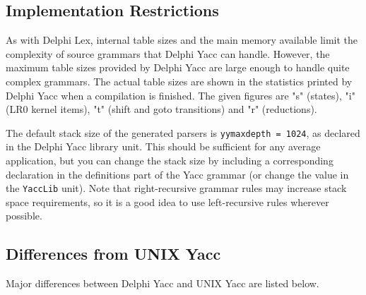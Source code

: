 \documentclass[a4paper]{article}
\begin{document}
\subsection{Implementation Restrictions}

As with Delphi Lex, internal table sizes and the main memory available limit the
complexity of source grammars that Delphi Yacc can handle. However, the maximum
table sizes provided by Delphi Yacc are large enough to handle quite complex
grammars. The actual table sizes are shown in the statistics printed by Delphi 
Yacc when a compilation
is finished. The given figures are "s" (states), "i" (LR0 kernel items), "t"
(shift and goto transitions) and "r" (reductions).

The default stack size of the generated parsers is \verb"yymaxdepth = 1024",
as declared in the Delphi Yacc library unit. This should be sufficient for any
average application, but you can change the stack size by including a
corresponding declaration in the definitions part of the Yacc grammar
(or change the value in the \verb"YaccLib" unit). Note that right-recursive
grammar rules may increase stack space requirements, so it is a good
idea to use left-recursive rules wherever possible.

\subsection{Differences from UNIX Yacc}

Major differences between Delphi Yacc and UNIX Yacc are listed below.
\end{document}
